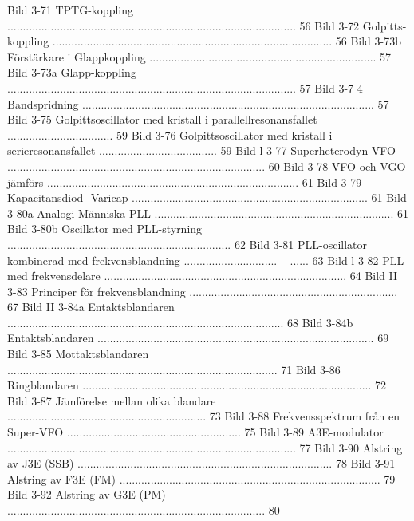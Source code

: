 \documentclass[a4paper,twoside,twocolumn,openright]{book}
\begin{document}
{{{{{{{{{{{Bild 3-71 TPTG-koppling ............................................................................................. 56
Bild 3-72 Golpitts-koppling .......................................................................................... 56
Bild 3-73b Förstärkare i Glappkoppling ......................................................................... 57
Bild 3-73a Glapp-koppling ............................................................................................. 57
Bild 3-7 4 Bandspridning .............................................................................................. 57
Bild 3-75 Golpittsoscillator med kristall i parallellresonansfallet .................................. 59
Bild 3-76 Golpittsoscillator med kristall i serieresonansfallet ...................................... 59
Bild l 3-77 Superheterodyn-VFO ................................................................................... 60
Bild 3-78 VFO och VGO jämförs ................................................................................. 61
Bild 3-79 Kapacitansdiod- Varicap ............................................................................ 61
Bild 3-80a Analogi Människa-PLL ............................................................................. 61
Bild 3-80b Oscillator med PLL-styrning ........................................................................ 62
Bild 3-81 PLL-oscillator kombinerad med frekvensblandning .............................. ~ ...... 63
Bild l 3-82 PLL med frekvensdelare .............................................................................. 64
Bild II 3-83 Principer för frekvensblandning ................................................................... 67
Bild II 3-84a Entaktsblandaren ......................................................................................... 68
Bild 3-84b Entaktsblandaren ......................................................................................... 69
Bild 3-85 Mottaktsblandaren ....................................................................................... 71
Bild 3-86 Ringblandaren ............................................................................................. 72
Bild 3-87 Jämförelse mellan olika blandare ................................................................ 73
Bild 3-88 Frekvensspektrum från en Super-VFO ........................................................ 75
Bild 3-89 A3E-modulator ............................................................................................. 77
Bild 3-90 Alstring av J3E (SSB) .................................................................................. 78
Bild 3-91 Alstring av F3E (FM) .................................................................................... 79
Bild 3-92 Alstring av G3E (PM) ................................................................................... 80

}}}}}}}}}}}
\end{document}
